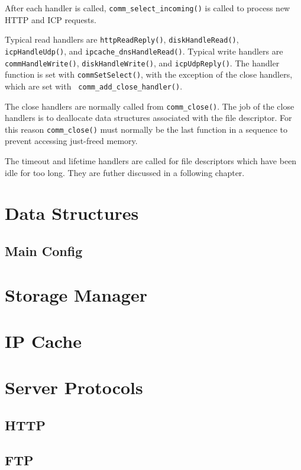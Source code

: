 After each handler is called, {\tt comm\_select\_incoming()} is
called to process new HTTP and ICP requests.

Typical read handlers are
{\tt httpReadReply()},
{\tt diskHandleRead()},
{\tt icpHandleUdp()},
and {\tt ipcache\_dnsHandleRead()}.
Typical write handlers are
{\tt commHandleWrite()},
{\tt diskHandleWrite()},
and {\tt icpUdpReply()}.
The handler function is set with {\tt commSetSelect()}, with the
exception of the close handlers, which are set with {\tt
comm\_add\_close\_handler()}.

The close handlers are normally called from {\tt comm\_close()}.  
The job of the close handlers is to deallocate data structures 
associated with the file descriptor.  For this reason {\tt comm\_close()}
must normally be the last function in a sequence to prevent accessing
just-freed memory.

The timeout and lifetime handlers are called for file descriptors which
have been idle for too long.  They are futher discussed in a following 
chapter.

\chapter{Data Structures}
\section{Main Config}

\chapter{Storage Manager}

\chapter{IP Cache}

\chapter{Server Protocols}
\section{HTTP}
\section{FTP}
